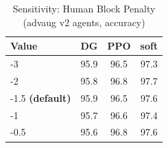 \begin{table}[h]
\centering
\caption{Sensitivity: Human Block Penalty (advaug v2 agents, accuracy)}
\label{tab:sensitivity_penalty_block_human}
\begin{tabular}{lccc}
\toprule
Value & DG & PPO & soft \\
\midrule
  -3 & 95.9 & 96.5 & 97.3 \\
  -2 & 95.8 & 96.8 & 97.7 \\
  -1.5 \textbf{(default)} & 95.9 & 96.5 & 97.6 \\
  -1 & 95.7 & 96.6 & 97.4 \\
  -0.5 & 95.6 & 96.8 & 97.6 \\
\bottomrule
\end{tabular}
\end{table}